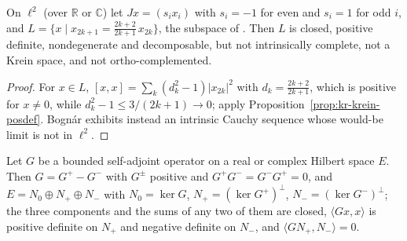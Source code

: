 \begin{example}
  \label{ex:kr-bognar}
  \leanok
  On $\ell^2$ (over $\mathbb{R}$ or $\mathbb{C}$) let $J x = (s_i x_i)$ with $s_i = -1$ for even
  and $s_i = 1$ for odd $i$, and
  $L = \{x \mid x_{2k+1} = \tfrac{2k+2}{2k+1}\, x_{2k}\}$, the subspace of
  \cite[Example~I.9.7, pp.~19--20]{Bog74}. Then $L$ is closed, positive definite, nondegenerate and
  decomposable, but not intrinsically complete, not a Krein space, and not ortho-complemented.
\end{example}

\begin{proof}
  \leanok
  For $x \in L$, $[x, x] = \sum_k (d_k^2 - 1)|x_{2k}|^2$ with $d_k = \tfrac{2k+2}{2k+1}$, which is
  positive for $x \ne 0$, while $d_k^2 - 1 \le 3/(2k+1) \to 0$; apply
  Proposition~\ref{prop:kr-krein-posdef}. Bognár exhibits instead an intrinsic Cauchy sequence
  whose would-be limit is not in $\ell^2$.
\end{proof}

\begin{lemma}
  \label{lem:kr-sign-decomposition}
  \leanok
  Let $G$ be a bounded self-adjoint operator on a real or complex Hilbert space $E$. Then
  $G = G^+ - G^-$ with $G^\pm$ positive and $G^+ G^- = G^- G^+ = 0$, and
  $E = N_0 \oplus N_+ \oplus N_-$ with $N_0 = \ker G$, $N_+ = (\ker G^+)^\perp$,
  $N_- = (\ker G^-)^\perp$; the three components and the sums of any two of them are closed,
  $\langle Gx, x\rangle$ is positive definite on $N_+$ and negative definite on $N_-$, and
  $\langle G N_+, N_-\rangle = 0$.
\end{lemma}

